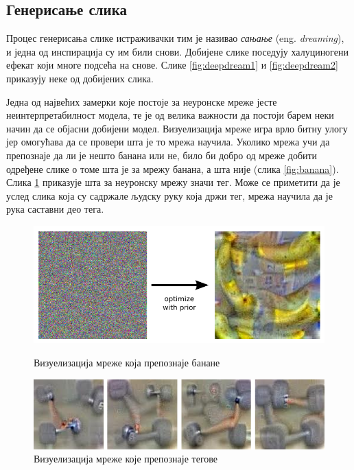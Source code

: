 \documentclass[a4paper]{article}
\begin{document}
\subsection{Генерисање слика}
\label{subsec:deepdreamGenerate}
Процес генерисања слике истраживачки тим је називао \textit{сањање} (eng. \textit{dreaming}),
и једна од инспирација су им били снови. Добијене слике поседују халуциногени ефекат који
многе подсећа на снове. Слике \ref{fig:deepdream1} и \ref{fig:deepdream2} приказују неке од добијених слика.

Једна од највећих замерки које постоје за неуронске мреже јесте неинтерпретабилност модела, те је од велика
важности да постоји барем неки начин да се објасни добијени модел.
Визуелизација мреже игра врло битну улогу јер омогућава да се провери шта је то мрежа научила. Уколико мрежа
учи да препознаје да ли је нешто банана или не, било би добро од мреже добити одређене слике о томе шта је за
мрежу банана, а шта није (слика \ref{fig:banana}). Слика \ref{fig:dumbbell} приказује шта за неуронску мрежу
значи тег. Може се приметити да је услед слика која су садржале људску руку која држи тег, мрежа научила
да је рука саставни део тега.


\begin{figure}[!tbp]
    \centering
    \begin{minipage}[b]{0.45\textwidth}
        \includegraphics[width=\textwidth]{./resources/noise-to-banana.png}
        \caption{Визуелизација мреже која препознаје банане}
        \label{fig:banana}
    \end{minipage}
    \hfill
    \begin{minipage}[b]{0.45\textwidth}
        \includegraphics[width=\textwidth]{./resources/dumbbells.png}
        \caption{Визуелизација мреже које препознаје тегове}
        \label{fig:dumbbell}
    \end{minipage}
\end{figure}
\end{document}
